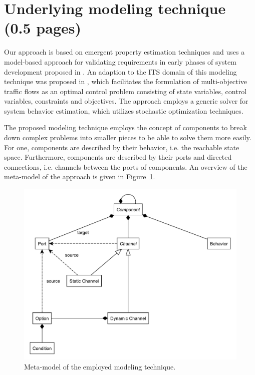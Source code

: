 \section{Underlying modeling technique (0.5 pages)}
\label{section:contribution_0}

Our approach is based on emergent property estimation techniques \cite{hackenberg2012towards} and uses a model-based approach for validating requirements in early phases of system development proposed in \cite{hackenberg2014rapid}. An adaption to the ITS domain of this modeling technique was proposed in \cite{ascher2014early}, which facilitates the formulation of multi-objective traffic flows as an optimal control problem consisting of state variables, control variables, constraints and objectives. The approach employs a generic solver for system behavior estimation, which utilizes stochastic optimization techniques.

The proposed modeling technique employs the concept of components to break down complex problems into smaller pieces to be able to solve them more easily. For one, components are described by their behavior, i.e. the reachable state space. Furthermore, components are described by their ports and directed connections, i.e. channels between the ports of components. An overview of the meta-model of the approach is given in Figure~\ref{fig:meta_model}.

\begin{figure}[h]
	\centering
	\includegraphics[width=\columnwidth]{../gfx/meta_model.pdf}
	\caption{Meta-model of the employed modeling technique.}
	\label{fig:meta_model}
\end{figure}

